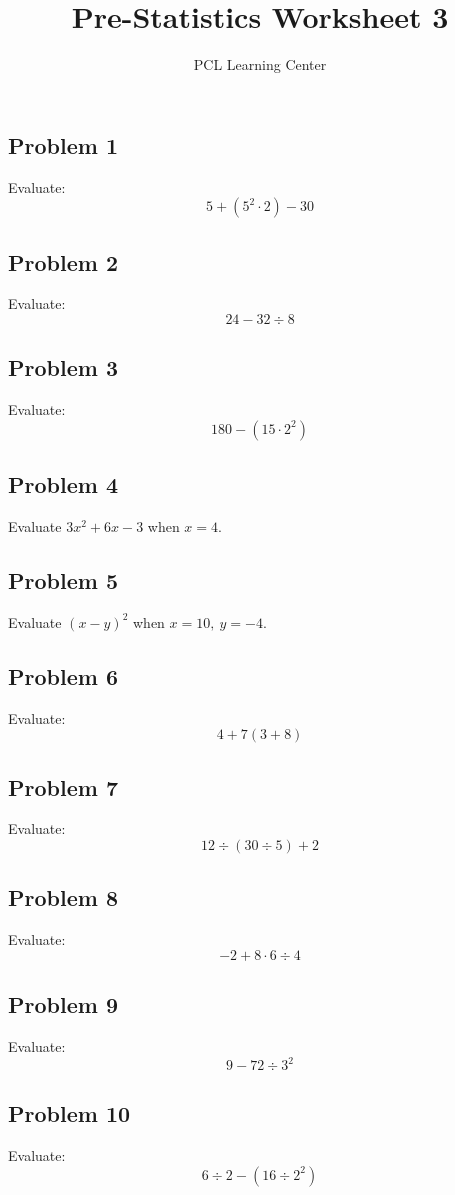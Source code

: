 \documentclass[12pt]{article}
\title{Pre-Statistics Worksheet 3}
\author{PCL Learning Center}
\date{}
\begin{document}
\maketitle

\subsection*{Problem 1}
Evaluate:  
\[
5 + (5^2 \cdot 2) - 30
\]

\subsection*{Problem 2}
Evaluate:  
\[
24 - 32 \div 8
\]

\subsection*{Problem 3}
Evaluate:  
\[
180 - (15 \cdot 2^2)
\]

\subsection*{Problem 4}
Evaluate \(3x^2 + 6x - 3\) when \(x = 4\).

\subsection*{Problem 5}
Evaluate \((x - y)^2\) when \(x = 10,\ y = -4\).

\subsection*{Problem 6}
Evaluate:  
\[
4 + 7(3 + 8)
\]

\subsection*{Problem 7}
Evaluate:  
\[
12 \div (30 \div 5) + 2
\]

\subsection*{Problem 8}
Evaluate:  
\[
-2 + 8 \cdot 6 \div 4
\]

\subsection*{Problem 9}
Evaluate:  
\[
9 - 72 \div 3^2
\]

\subsection*{Problem 10}
Evaluate:  
\[
6 \div 2 - (16 \div 2^2)
\]
\end{document}
